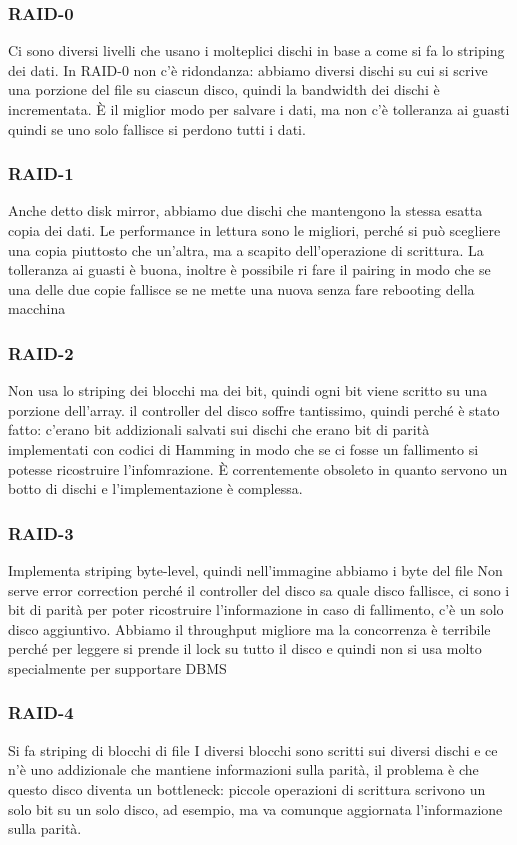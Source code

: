 \documentclass[12pt, oneside]{extbook} %
\begin{document}
\subsubsection{RAID-0}
Ci sono diversi livelli che usano i molteplici dischi in base a come si fa lo striping dei dati. In RAID-0 non c'è ridondanza: abbiamo diversi dischi su cui si scrive una porzione del file su ciascun disco, quindi la bandwidth dei dischi è incrementata. È il miglior modo per salvare i dati, ma non c'è tolleranza ai guasti quindi se uno solo fallisce si perdono tutti i dati.
\subsubsection{RAID-1}
Anche detto disk mirror, abbiamo due dischi che mantengono la stessa esatta copia dei dati.
Le performance in lettura sono le migliori, perché si può scegliere una copia piuttosto che un'altra, ma a scapito dell'operazione di scrittura. La tolleranza ai guasti è buona, inoltre è possibile ri fare il pairing in modo che se una delle due copie fallisce se ne mette una nuova senza fare rebooting della macchina
\subsubsection{RAID-2}
Non usa lo striping dei blocchi ma dei bit, quindi ogni bit viene scritto su una porzione dell'array.
il controller del disco soffre tantissimo, quindi perché è stato fatto: c'erano bit addizionali salvati sui dischi che erano bit di parità implementati con codici di Hamming in modo che se ci fosse un fallimento si potesse ricostruire l'infomrazione. È correntemente obsoleto in quanto servono un botto di dischi e l'implementazione è complessa.
\subsubsection{RAID-3}
Implementa striping byte-level, quindi nell'immagine abbiamo i byte del file
Non serve error correction perché il controller del disco sa quale disco fallisce, ci sono i bit di parità per poter ricostruire l'informazione in caso di fallimento, c'è un solo disco aggiuntivo. Abbiamo il throughput migliore ma la concorrenza è terribile perché per leggere si prende il lock su tutto il disco e quindi non si usa molto specialmente per supportare DBMS
\subsubsection{RAID-4}
Si fa striping di blocchi di file
I diversi blocchi sono scritti sui diversi dischi e ce n'è uno addizionale che mantiene informazioni sulla parità, il problema è che questo disco diventa un bottleneck: piccole operazioni di scrittura scrivono un solo bit su un solo disco, ad esempio, ma va comunque aggiornata l'informazione sulla parità.
\end{document}
